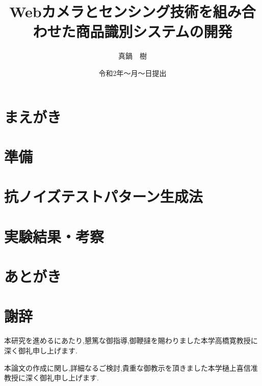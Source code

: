 

\newenvironment{indention}[1]{\par
\addtolength{\leftskip}{#1}
\begingroup}{\endgroup\par}

\title{Webカメラとセンシング技術を組み合わせた商品識別システムの開発}
\author{真鍋　樹}
\date{令和2年～月～日提出}


\maketitle
\tableofcontents
\cleardoublepage
{}

\chapter{まえがき}


\chapter{準備}


\chapter{抗ノイズテストパターン生成法}


\chapter{実験結果・考察}


\chapter{あとがき}



\newpage
{}
\chapter*{謝辞}
本研究を進めるにあたり,懇篤な御指導,御鞭撻を賜わりました本学高橋寛教授に深く御礼申し上げます.

本論文の作成に関し,詳細なるご検討,貴重な御教示を頂きました本学樋上喜信准教授に深く御礼申し上げます.

